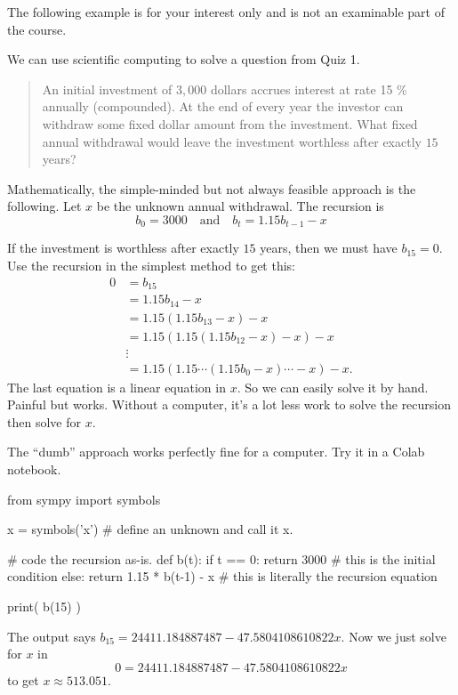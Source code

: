 \documentclass[../main.tex]{subfiles}
\begin{document}
The following example is for your interest only and is not an examinable part of the course. 
\begin{computing}
  We can use scientific computing to solve a question from Quiz 1.

  \begin{quote}
    An initial investment of \(3,000\) dollars accrues interest at rate 15 \% annually (compounded). At the end of every year the investor can withdraw some fixed dollar amount from the investment. What fixed annual withdrawal would leave the investment worthless after exactly \(15\) years?
  \end{quote}

  Mathematically, the simple-minded but not always feasible approach is the following.  Let \(x\) be the unknown annual withdrawal. The recursion is
  \[
    b_{0} = 3000 \quad\text{and}\quad b_{t} = 1.15 b_{t-1} - x
  \]

  If the investment is worthless after exactly \(15\) years, then we must have \(b_{15} = 0\). Use the recursion in the simplest method to get this:
  \begin{align*}
    0 & = b_{15} \\
      &= 1.15 b_{14} - x \\
      &= 1.15 (1.15 b_{13} - x) - x \\
      &= 1.15 (1.15 (1.15 b_{12} - x)  - x) - x \\
      &\vdots \\
      &= 1.15 (1.15 \cdots (1.15 b_{0} - x) \cdots - x) - x.
  \end{align*}
  The last equation is a linear equation in \(x\). So we can easily solve it by hand. Painful but works.  Without a computer, it's a lot less work to solve the recursion then solve for \(x\). 

  The ``dumb'' approach works perfectly fine for a computer.  Try it in a Colab notebook.
  \begin{pythoncode}
from sympy import symbols

x = symbols('x') # define an unknown and call it x.

# code the recursion as-is.
def b(t):
  if t == 0:
    return 3000                # this is the initial condition
  else:
    return 1.15 * b(t-1) - x   # this is literally the recursion equation 

print( b(15) )
  \end{pythoncode}
  The output says \(b_{15} = 24411.184887487−47.5804108610822x\). Now we just solve for \(x\) in \[0 = 24411.184887487−47.5804108610822x\]
  to get \(x \approx 513.051\). 
\end{computing}
\end{document}
